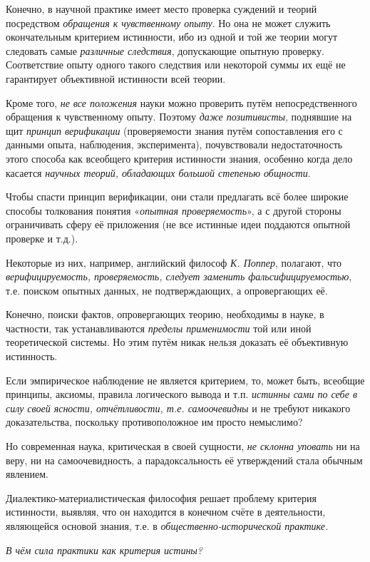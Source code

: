\documentclass[a4paper,14pt,russian]{extreport}
\begin{document}
Конечно, в научной практике имеет место проверка суждений и теорий посредством \emph{обращения к чувственному опыту}. Но она не может служить окончательным критерием истинности, ибо из одной и той же теории могут следовать самые \emph{различные следствия}, допускающие опытную проверку. Соответствие опыту одного такого следствия или некоторой суммы их ещё не гарантирует объективной истинности всей теории.

Кроме того, \emph{не все положения} науки можно проверить путём непосредственного обращения к чувственному опыту. Поэтому \emph{даже позитивисты}, поднявшие на щит \emph{принцип верификации} (проверяемости знания путём сопоставления его с данными опыта, наблюдения, эксперимента), почувствовали недостаточность этого способа как всеобщего критерия истинности знания, особенно когда дело касается \emph{научных теорий, обладающих большой степенью общности}.

Чтобы спасти принцип верификации, они стали предлагать всё более широкие способы толкования понятия «\emph{опытная проверяемость}», а с другой стороны ограничивать сферу её приложения (не все истинные идеи поддаются опытной проверке и т.д.).

Некоторые из них, например, английский философ \emph{К. Поппер}, полагают, что \emph{верифицируемость, проверяемость, следует заменить фальсифицируемостью}, т.е. поиском опытных данных, не подтверждающих, а опровергающих её.

Конечно, поиски фактов, опровергающих теорию, необходимы в науке, в частности, так устанавливаются \emph{пределы применимости} той или иной теоретической системы. Но этим путём никак нельзя доказать её объективную истинность.

Если эмпирическое наблюдение не является критерием, то, может быть, всеобщие принципы, аксиомы, правила логического вывода и т.п. \emph{истинны сами по себе в силу своей ясности, отчётливости, т.е. самоочевидны} и не требуют никакого доказательства, поскольку противоположное им просто немыслимо?

Но современная наука, критическая в своей сущности, \emph{не склонна уповать} ни на веру, ни на самоочевидность, а парадоксальность её утверждений стала обычным явлением.

Диалектико-материалистическая философия решает проблему критерия истинности, выявляя, что он находится в конечном счёте в деятельности, являющейся основой знания, т.е. в \emph{общественно-исторической практике.}

\emph{В чём сила практики как критерия истины?}
\end{document}
